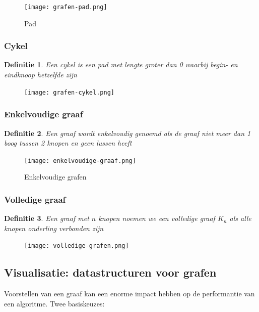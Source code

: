 \documentclass{article}
\newtheorem{theorem}{Definitie}[section]
\begin{document}
\begin{figure}[H]
    \centering
    \texttt{[image: grafen-pad.png]}
    \caption{Pad}
\end{figure}


\subsubsection{Cykel}

\begin{theorem}
    Een cykel is een pad met lengte groter dan 0 waarbij begin- en eindknoop hetzelfde zijn
\end{theorem}

\begin{figure}[H]
    \centering
    \texttt{[image: grafen-cykel.png]}
\end{figure}

\subsubsection{Enkelvoudige graaf}

\begin{theorem}
    Een graaf wordt enkelvoudig genoemd als de graaf niet meer dan 1 boog tussen 2 knopen en geen lussen heeft
\end{theorem}

\begin{figure}[H]
    \centering
    \texttt{[image: enkelvoudige-graaf.png]}
    \caption{Enkelvoudige grafen}
\end{figure}

\subsubsection{Volledige graaf}

\begin{theorem}
    Een graaf met $n$ knopen noemen we een volledige graaf $K_n$ als alle knopen onderling verbonden zijn
\end{theorem}

\begin{figure}[H]
    \centering
    \texttt{[image: volledige-grafen.png]}
\end{figure}

\subsection{Visualisatie: datastructuren voor grafen}

Voorstellen van een graaf kan een enorme impact hebben op de performantie van een algoritme. Twee basiskeuzes:
\end{document}
